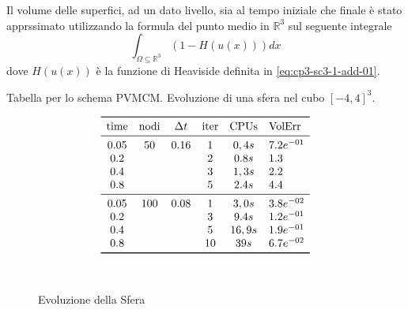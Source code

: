 \begin{osservazione}
Il volume delle superfici, ad un dato livello,  sia al tempo iniziale
che finale è stato apprssimato utilizzando la formula del punto medio
in $\mathbb{R}^3$ sul seguente integrale
\[
\int_{\Omega\subseteq\mathbb{R}^3}(1-H(u(x)))dx
\]
dove $H(u(x))$ è la funzione di Heaviside definita in \eqref{eq:cp3-sc3-1-add-01}.
\end{osservazione}

\begin{table}[htb!]
\caption{Tabella per lo schema PVMCM. Evoluzione di una sfera nel cubo $[-4,4]^3$.}
\label{tab:cp4-sc1-01}
\[
\begin{array}{*{5}{c}l}
    \toprule
    \text{time} &\text{nodi} &\Delta t &\text{iter} &\text{CPUs}&\text{VolErr} \\
    \midrule
     0.05       & 50         & 0.16    & 1          & 0,4s      &7.2e^{-01}\\ 
     0.2        &            &         & 2          & 0.8s      &1.3\\
     0.4        &            &         & 3          & 1,3s      &2.2\\ 
     0.8        &            &         & 5          & 2.4s      &4.4\\
     \midrule
     0.05       & 100        & 0.08    & 1          & 3,0s      &3.8e^{-02}\\ 
     0.2        &            &         & 3          & 9.4s      &1.2e^{-01}\\
     0.4        &            &         & 5          & 16,9s     &1.9e^{-01}\\ 
     0.8        &            &         & 10         & 39s       &6.7e^{-02}\\
    \bottomrule
\end{array}
\]
\end{table}

\begin{figure}[htb!]
  \centering
  \quad
  \\
  \quad
  \quad
  \caption{Evoluzione della Sfera}
  \label{fig:cp4-sc1-01}
\end{figure}

